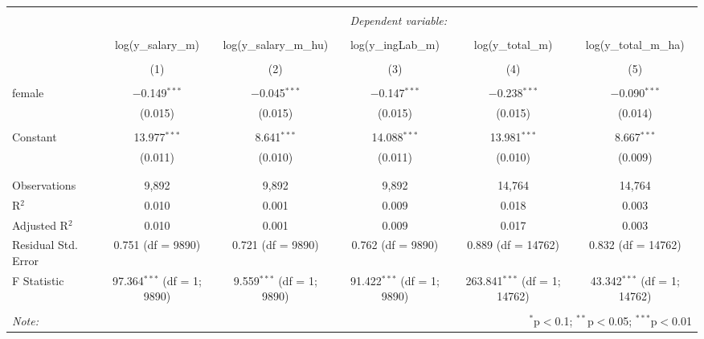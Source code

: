 
\begin{table}[!htbp] \centering 
  \caption{} 
  \label{} 
\begin{tabular}{@{\extracolsep{5pt}}lccccc} 
\\[-1.8ex]\hline 
\hline \\[-1.8ex] 
 & \multicolumn{5}{c}{\textit{Dependent variable:}} \\ 
\cline{2-6} 
\\[-1.8ex] & log(y\_salary\_m) & log(y\_salary\_m\_hu) & log(y\_ingLab\_m) & log(y\_total\_m) & log(y\_total\_m\_ha) \\ 
\\[-1.8ex] & (1) & (2) & (3) & (4) & (5)\\ 
\hline \\[-1.8ex] 
 female & $-$0.149$^{***}$ & $-$0.045$^{***}$ & $-$0.147$^{***}$ & $-$0.238$^{***}$ & $-$0.090$^{***}$ \\ 
  & (0.015) & (0.015) & (0.015) & (0.015) & (0.014) \\ 
  & & & & & \\ 
 Constant & 13.977$^{***}$ & 8.641$^{***}$ & 14.088$^{***}$ & 13.981$^{***}$ & 8.667$^{***}$ \\ 
  & (0.011) & (0.010) & (0.011) & (0.010) & (0.009) \\ 
  & & & & & \\ 
\hline \\[-1.8ex] 
Observations & 9,892 & 9,892 & 9,892 & 14,764 & 14,764 \\ 
R$^{2}$ & 0.010 & 0.001 & 0.009 & 0.018 & 0.003 \\ 
Adjusted R$^{2}$ & 0.010 & 0.001 & 0.009 & 0.017 & 0.003 \\ 
Residual Std. Error & 0.751 (df = 9890) & 0.721 (df = 9890) & 0.762 (df = 9890) & 0.889 (df = 14762) & 0.832 (df = 14762) \\ 
F Statistic & 97.364$^{***}$ (df = 1; 9890) & 9.559$^{***}$ (df = 1; 9890) & 91.422$^{***}$ (df = 1; 9890) & 263.841$^{***}$ (df = 1; 14762) & 43.342$^{***}$ (df = 1; 14762) \\ 
\hline 
\hline \\[-1.8ex] 
\textit{Note:}  & \multicolumn{5}{r}{$^{*}$p$<$0.1; $^{**}$p$<$0.05; $^{***}$p$<$0.01} \\ 
\end{tabular} 
\end{table} 
